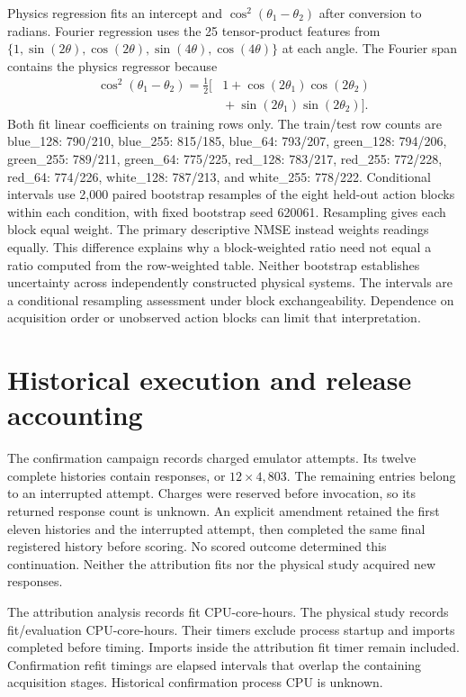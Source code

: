 Physics regression fits an intercept and $\cos^2(\theta_1-\theta_2)$ after
conversion to radians. Fourier regression uses the 25 tensor-product features
from $\{1,\sin(2\theta),\cos(2\theta),\sin(4\theta),\cos(4\theta)\}$ at each
angle. The Fourier span contains the physics regressor because
\[
\begin{aligned}
 \cos^2(\theta_1-\theta_2)
 =\frac{1}{2}\bigl[&1+\cos(2\theta_1)\cos(2\theta_2)\\
                   &{}+\sin(2\theta_1)\sin(2\theta_2)\bigr].
\end{aligned}
\]
Both fit linear coefficients on training rows only. The train/test row counts
are blue\_128: 790/210, blue\_255: 815/185, blue\_64: 793/207,
green\_128: 794/206, green\_255: 789/211, green\_64: 775/225,
red\_128: 783/217, red\_255: 772/228, red\_64: 774/226,
white\_128: 787/213, and white\_255: 778/222. Conditional intervals
use 2,000 paired bootstrap resamples of the eight held-out action blocks within
each condition, with fixed bootstrap seed 620061. Resampling gives each block
equal weight. The primary descriptive NMSE instead weights readings equally.
This difference explains why a block-weighted ratio need not equal a ratio
computed from the row-weighted table. Neither bootstrap establishes uncertainty
across independently constructed physical systems. The intervals are a conditional
resampling assessment under block exchangeability. Dependence on acquisition order or
unobserved action blocks can limit that interpretation.

\section{Historical execution and release accounting}
\label{app:accounting}
The confirmation campaign records \ConfirmationChargedCalls{} charged emulator
attempts. Its twelve complete histories contain
\PersistedConfirmationResponses{} responses, or $12\times4{,}803$.
The remaining \InterruptedConfirmationAttempts{} entries belong to an
interrupted attempt. Charges were reserved before invocation, so its returned
response count is unknown. An explicit amendment retained the first eleven
histories and the interrupted attempt, then completed the same final registered
history before scoring. No scored outcome determined this continuation.
Neither the attribution fits nor the physical study acquired new responses.

The attribution analysis records \AFitCPU{} fit CPU-core-hours. The physical study
records \CCPU{} fit/evaluation CPU-core-hours. Their timers exclude process
startup and imports completed before timing. Imports inside the attribution
fit timer remain included. Confirmation refit timings are elapsed intervals
that overlap the containing acquisition stages. Historical confirmation process
CPU is unknown.

